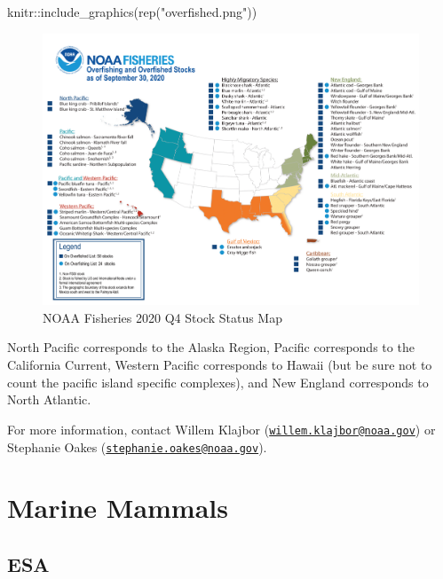 \documentclass[
]{book}
\newenvironment{Shaded}{\begin{snugshade}}{\end{snugshade}}
\newcommand{\FunctionTok}[1]{\textcolor[rgb]{0.00,0.00,0.00}{#1}}
\newcommand{\NormalTok}[1]{#1}
\newcommand{\SpecialCharTok}[1]{\textcolor[rgb]{0.00,0.00,0.00}{#1}}
\newcommand{\StringTok}[1]{\textcolor[rgb]{0.31,0.60,0.02}{#1}}
\begin{document}
\begin{Shaded}
\begin{Highlighting}[]
\NormalTok{knitr}\SpecialCharTok{::}\FunctionTok{include\_graphics}\NormalTok{(}\FunctionTok{rep}\NormalTok{(}\StringTok{"overfished.png"}\NormalTok{))}
\end{Highlighting}
\end{Shaded}

\begin{figure}
\includegraphics[width=38.39in]{overfished} \caption{NOAA Fisheries 2020 Q4 Stock Status Map}\label{fig:unnamed-chunk-4}
\end{figure}

North Pacific corresponds to the Alaska Region, Pacific corresponds to the California Current, Western Pacific corresponds to Hawaii (but be sure not to count the pacific island specific complexes), and New England corresponds to North Atlantic.

For more information, contact Willem Klajbor (\href{mailto:willem.klajbor@noaa.gov}{\nolinkurl{willem.klajbor@noaa.gov}}) or Stephanie Oakes (\href{mailto:stephanie.oakes@noaa.gov}{\nolinkurl{stephanie.oakes@noaa.gov}}).

\hypertarget{marine-mammals}{%
\chapter{Marine Mammals}\label{marine-mammals}}

\hypertarget{esa}{%
\section{ESA}\label{esa}}
\end{document}
